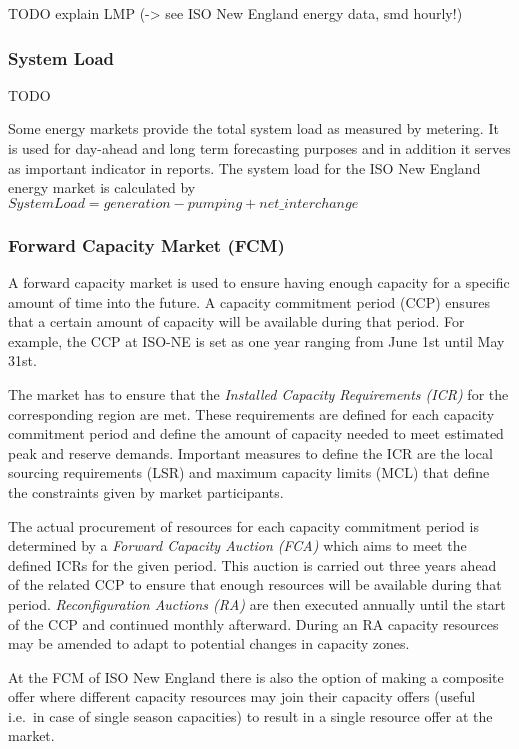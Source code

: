 TODO explain LMP (-> see ISO New England energy data, smd hourly!)

\subsubsection{System Load}

TODO

Some energy markets provide the total system load as measured by metering. It is used for day-ahead and long term forecasting purposes and in addition it serves as important indicator in reports. The system load for the ISO New England energy market is calculated by $System Load = generation - pumping + net\_interchange$


\subsubsection{Forward Capacity Market (FCM)}

A forward capacity market is used to ensure having enough capacity for a specific amount of time into the future. A capacity commitment period (CCP) ensures that a certain amount of capacity will be available during that period. For example, the CCP at ISO-NE is set as one year ranging from June 1st until May 31st. 

The market has to ensure that the \emph{Installed Capacity Requirements (ICR)} for the corresponding region are met. These requirements are defined for each capacity commitment period and define the amount of capacity needed to meet estimated peak and reserve demands. Important measures to define the ICR are the local sourcing requirements (LSR) and maximum capacity limits (MCL) that define the constraints given by market participants. %

The actual procurement of resources for each capacity commitment period is determined by a \emph{Forward Capacity Auction (FCA)} which aims to meet the defined ICRs for the given period.
This auction is carried out three years ahead of the related CCP to ensure that enough resources will be available during that period. \emph{Reconfiguration Auctions (RA)} are then executed annually until the start of the CCP and continued monthly afterward. During an RA capacity resources may be amended to adapt to potential changes in capacity zones. 

At the FCM of ISO New England there is also the option of making a composite offer where different capacity resources may join their capacity offers (useful i.e.~in case of single season capacities) to result in a single resource offer at the market. 

